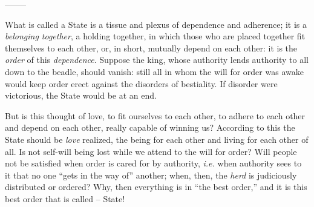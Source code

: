 \begin{center}
--------\end{center}


What is called a State is a tissue and plexus of dependence and adherence; it 
is a \textit{belonging together}, a holding together, in which those who are 
placed together fit themselves to each other, or, in short, mutually depend on 
each other: it is the \textit{order} of this \textit{dependence}. Suppose the 
king, whose authority lends authority to all down to the beadle, should 
vanish: still all in whom the will for order was awake would keep order erect 
against the disorders of bestiality. If disorder were victorious, the State 
would be at an end.

But is this thought of love, to fit ourselves to each other, to adhere to each 
other and depend on each other, really capable of winning us? According to 
this the State should be \textit{love} realized, the being for each other and 
living for each other of all. Is not self-will being lost while we attend to 
the will for order? Will people not be satisfied when order is cared for by 
authority, \textit{i.e.} when authority sees to it that no one ``gets in the 
way of'' another; when, then, the \textit{herd} is judiciously distributed or 
ordered? Why, then everything is in ``the best order,'' and it is this best 
order that is called -- State!


